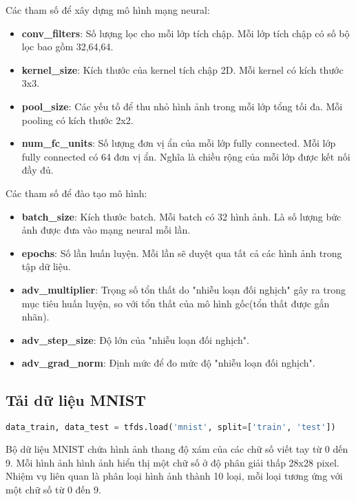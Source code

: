 Các tham số để xây dựng mô hình mạng neural:
\begin{itemize}
    \item \textbf{conv\_filters}: Số lượng lọc cho mỗi lớp tích chập. Mỗi lớp tích chập có số bộ lọc bao gồm 32,64,64.
    \item \textbf{kernel\_size}: Kích thước của kernel tích chập 2D. Mỗi kernel có kích thước 3x3.
    \item \textbf{pool\_size}: Các yếu tố để thu nhỏ hình ảnh trong mỗi lớp tổng tối đa. Mỗi pooling có kích thước 2x2.
    \item \textbf{num\_fc\_units}: Số lượng đơn vị ẩn của mỗi lớp fully connected. Mỗi lớp fully connected có 64 đơn vị ẩn. Nghĩa là chiều rộng của mỗi lớp được kết nối đầy đủ.
\end{itemize}

Các tham số để đào tạo mô hình:
\begin{itemize}
    \item \textbf{batch\_size}: Kích thước batch. Mỗi batch có 32 hình ảnh. Là số lượng bức ảnh được đưa vào mạng neural mỗi lần.
    \item \textbf{epochs}: Số lần huấn luyện. Mỗi lần sẽ duyệt qua tất cả các hình ảnh trong tập dữ liệu.
    \item \textbf{adv\_multiplier}: Trọng số tổn thất do "nhiễu loạn đối nghịch" gây ra trong mục tiêu huấn luyện, so với tổn thất của mô hình gốc(tổn thất được gắn nhãn).
    \item \textbf{adv\_step\_size}: Độ lớn của "nhiễu loạn đối nghịch".
    \item \textbf{adv\_grad\_norm}: Định mức để đo mức độ "nhiễu loạn đối nghịch". %
\end{itemize}

\subsection{Tải dữ liệu MNIST}
\begin{lstlisting}[language=Python]
    data_train, data_test = tfds.load('mnist', split=['train', 'test'])
\end{lstlisting}

Bộ dữ liệu MNIST chứa hình ảnh thang độ xám của các chữ số viết tay từ 0 dến 9. Mỗi hình ảnh hình ảnh hiển thị một chữ số ở độ phân giải thấp 28x28 pixel.
Nhiệm vụ liên quan là phân loại hình ảnh thành 10 loại, mỗi loại tương ứng với một chữ số từ 0 đến 9.

